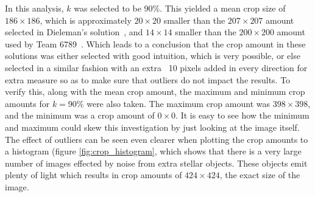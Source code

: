 \documentclass[12pt,a4paper,oneside,oldfontcommands]{memoir}
\begin{document}
\begin{Declaration Of OriginalityOrginality}
In this analysis, \(k\) was selected to be 90\%. This yielded a mean crop size of \(186\times186\), which is approximately \(20\times20\) smaller than the \(207\times207\) amount selected in Dieleman's solution~\cite{Sanders-GZ}, and \(14\times14\) smaller than the \(200\times200\) amount used by Team 6789~\cite{Nguyen}. Which leads to a conclusion that the crop amount in these solutions was either selected with good intuition, which is very possible, or else selected in a similar fashion with an extra ~10 pixels added in every direction for extra measure so as to make sure that outliers do not impact the results. To verify this, along with the mean crop amount, the maximum and minimum crop amounts for \(k=90\%\) were also taken. The maximum crop amount was \(398\times398\), and the minimum was a crop amount of \(0\times0\). It is easy to see how the minimum and maximum could skew this investigation by just looking at the image itself. The effect of outliers can be seen even clearer when plotting the crop amounts to a histogram (figure \ref{fig:crop_histogram}, which shows that there is a very large number of images effected by noise from extra stellar objects. These objects emit plenty of light which results in crop amounts of \(424\times424\), the exact size of the image.



\end{Declaration Of OriginalityOrginality}
\end{document}
